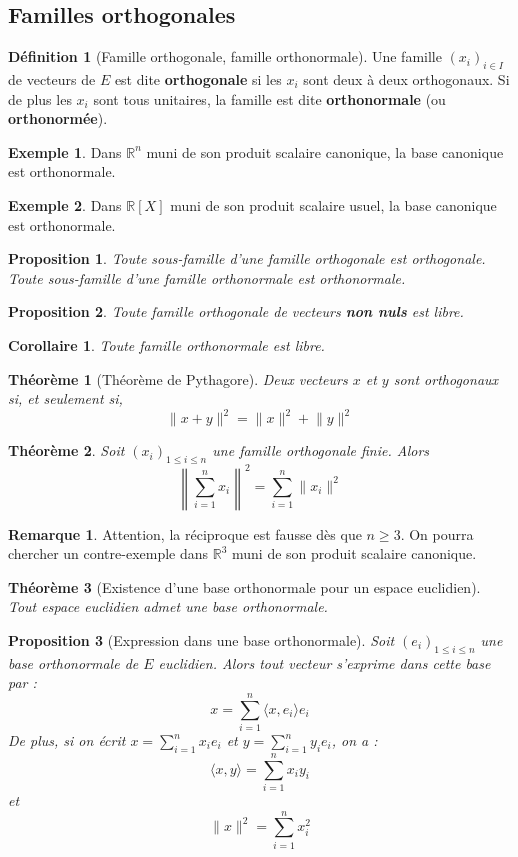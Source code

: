 \documentclass[french]{book}
\newcommand{\R}{\mathbb{R}}
\theoremstyle{plain}
\newtheorem{thm}{Théorème}[chapter]
\newtheorem{prop}{Proposition}[chapter]
\newtheorem{cor}{Corollaire}[chapter]
\theoremstyle{definition}
\newtheorem{dfn}{Définition}[chapter]
\newtheorem{exa}{Exemple}[chapter]
\newtheorem{rmq}{Remarque}[chapter]
\theoremstyle{remark}
\begin{document}
\subsection{Familles orthogonales}
\begin{dfn}[Famille orthogonale, famille orthonormale]
	Une famille $(x_i)_{i\in I}$ de vecteurs de $E$ est dite \textbf{orthogonale} si les $x_i$ sont deux à deux orthogonaux. Si de plus les $x_i$ sont tous unitaires, la famille est dite \textbf{orthonormale} (ou \textbf{orthonormée}).
\end{dfn}
\begin{exa}
	Dans $\R^n$ muni de son produit scalaire canonique, la base canonique est orthonormale.
\end{exa}
\begin{exa}
	Dans $\R[X]$ muni de son produit scalaire usuel, la base canonique est orthonormale.
\end{exa}
\begin{prop}
	Toute sous-famille d'une famille orthogonale est orthogonale. Toute sous-famille d'une famille orthonormale est orthonormale. 
\end{prop}
\begin{prop}
	Toute famille orthogonale de vecteurs \textbf{non nuls} est libre.
\end{prop}
\begin{cor}
	Toute famille orthonormale est libre.
\end{cor}
\begin{thm}[Théorème de Pythagore]
	Deux vecteurs $x$ et $y$ sont orthogonaux si, et seulement si, $$\lVert x+y\rVert^2=\lVert x\rVert^2+\lVert y\rVert^2$$
\end{thm}
\begin{thm}
	Soit $(x_i)_{1\leqslant i\leqslant n}$ une famille orthogonale finie. Alors $$\left\lVert \sum_{i=1}^{n}x_i\right\rVert^2=\sum_{i=1}^{n}\lVert x_i\rVert^2$$
\end{thm}
\begin{rmq} Attention, la réciproque est fausse dès que $n\geqslant 3$. On pourra chercher un contre-exemple dans $\R^3$ muni de son produit scalaire canonique. \end{rmq}
\begin{thm}[Existence d'une base orthonormale pour un espace euclidien]
	Tout espace euclidien admet une base orthonormale.
\end{thm}
\begin{prop}[Expression dans une base orthonormale]
	Soit $(e_i)_{1\leqslant i\leqslant n}$ une base orthonormale de $E$ euclidien. Alors tout vecteur s'exprime dans cette base par : $$x=\sum_{i=1}^{n}\langle x,e_i\rangle e_i$$ De plus, si on écrit $\displaystyle x=\sum_{i=1}^{n}x_ie_i$ et $\displaystyle y=\sum_{i=1}^{n}y_ie_i$, on a : $$\langle x,y\rangle =\sum_{i=1}^{n}x_iy_i$$ et $$\lVert x\rVert^2=\sum_{i=1}^{n}x_i^2$$
\end{prop}
\end{document}
